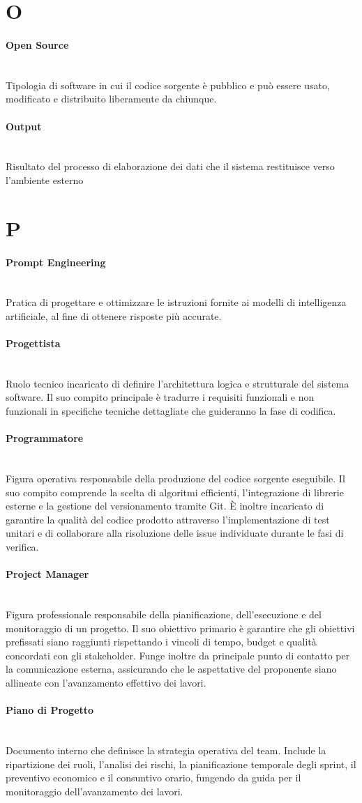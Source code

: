 \documentclass[a4paper, 10pt, colorlinks=true, linkcolor=black, urlcolor=blue, citecolor=blue, hidelinks]{article}
\newcommand{\glossaryterm}[2]{
    \paragraph{#1 \label{term:#1}} \mbox{} \\
    #2
    \vspace{0.5em}
}
\begin{document}
\newpage

\section*{O}

\glossaryterm{Open Source}{Tipologia di software in cui il codice sorgente è pubblico e può essere usato, modificato e distribuito liberamente da chiunque.}

\glossaryterm{Output}{Risultato del processo di elaborazione dei dati che il sistema restituisce verso l'ambiente esterno}

\newpage

\section*{P}

\glossaryterm{Prompt Engineering}{Pratica di progettare e ottimizzare le istruzioni fornite ai modelli di intelligenza artificiale, al fine di ottenere risposte più accurate.}

\glossaryterm{Progettista}{Ruolo tecnico incaricato di definire l'architettura logica e strutturale del sistema software. Il suo compito principale è tradurre i requisiti funzionali e non funzionali in specifiche tecniche dettagliate che guideranno la fase di codifica.}

\glossaryterm{Programmatore}{Figura operativa responsabile della produzione del codice sorgente eseguibile. Il suo compito comprende la scelta di algoritmi efficienti, l'integrazione di librerie esterne e la gestione del versionamento tramite Git. È inoltre incaricato di garantire la qualità del codice prodotto attraverso l'implementazione di test unitari e di collaborare alla risoluzione delle issue individuate durante le fasi di verifica.}

\glossaryterm{Project Manager}{Figura professionale responsabile della pianificazione, dell'esecuzione e del monitoraggio di un progetto. Il suo obiettivo primario è garantire che gli obiettivi prefissati siano raggiunti rispettando i vincoli di tempo, budget e qualità concordati con gli stakeholder. Funge inoltre da principale punto di contatto per la comunicazione esterna, assicurando che le aspettative del proponente siano allineate con l'avanzamento effettivo dei lavori.}

\glossaryterm{Piano di Progetto}{Documento interno che definisce la strategia operativa del team. Include la ripartizione dei ruoli, l'analisi dei rischi, la pianificazione temporale degli sprint, il preventivo economico e il consuntivo orario, fungendo da guida per il monitoraggio dell'avanzamento dei lavori.}
\end{document}
